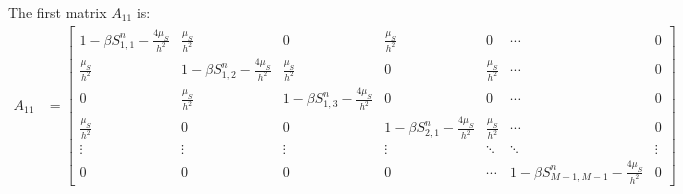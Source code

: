 The first matrix \(A_{11}\) is:
\small
\begin{align*}
  A_{11} & = \scriptscriptstyle
  \begin{bmatrix}
    1 - \beta S_{1,1}^n - \tfrac{4\mu_S}{h^2} & \tfrac{\mu_S}{h^2}                        & 0                                         & \tfrac{\mu_S}{h^2}                        & 0                  & \cdots                                        & 0      \\
    \tfrac{\mu_S}{h^2}                        & 1 - \beta S_{1,2}^n - \tfrac{4\mu_S}{h^2} & \tfrac{\mu_S}{h^2}                        & 0                                         & \tfrac{\mu_S}{h^2} & \cdots                                        & 0      \\
    0                                         & \frac{\mu_S}{h^2}                         & 1 - \beta S_{1,3}^n - \tfrac{4\mu_S}{h^2} & 0                                         & 0                  & \cdots                                        & 0      \\
    \tfrac{\mu_S}{h^2}                        & 0                                         & 0                                         & 1 - \beta S_{2,1}^n - \tfrac{4\mu_S}{h^2} & \tfrac{\mu_S}{h^2} & \cdots                                        & 0      \\
    \vdots                                    & \vdots                                    & \vdots                                    & \vdots                                    & \ddots             & \ddots                                        & \vdots \\
    0                                         & 0                                         & 0                                         & 0                                         & \cdots             & 1 - \beta S_{M-1,M-1}^n - \tfrac{4\mu_S}{h^2} & 0
  \end{bmatrix}
\end{align*}

